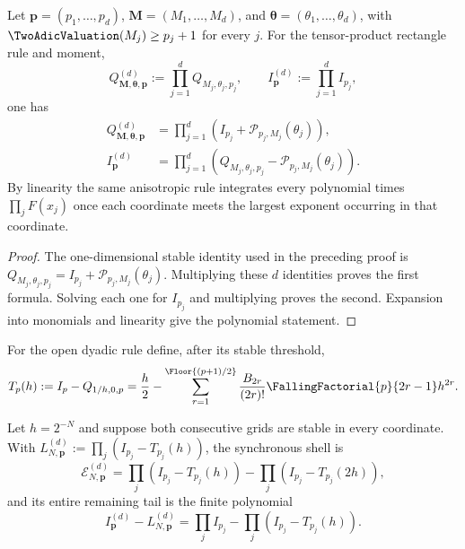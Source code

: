 \begin{theorem}
\label{thm:tensor-correction}
Let $\bm p=(p_1,\ldots,p_d)$, $\bm M=(M_1,\ldots,M_d)$, and
$\bm\theta=(\theta_1,\ldots,\theta_d)$, with
$\TwoAdicValuation(M_j)\ge p_j+1$ for every $j$.  For the tensor-product
rectangle rule and moment,
\[
 Q_{\bm M,\bm\theta,\bm p}^{(d)}
 :=\prod_{j=1}^dQ_{M_j,\theta_j,p_j},
 \qquad I_{\bm p}^{(d)}:=\prod_{j=1}^dI_{p_j},
\]
one has
\begin{align}
 Q_{\bm M,\bm\theta,\bm p}^{(d)}
 &=\prod_{j=1}^d\left(I_{p_j}+\mathcal P_{p_j,M_j}(\theta_j)\right),
 \label{eq:tensor-product-correction}\\
  I_{\bm p}^{(d)}
  &=\boxed{\prod_{j=1}^d\left(Q_{M_j,\theta_j,p_j}
  -\mathcal P_{p_j,M_j}(\theta_j)\right)}.
 \label{eq:tensor-exact-moment}
\end{align}
By linearity the same anisotropic rule integrates every polynomial times
$\prod_jF(x_j)$ once each coordinate meets the largest exponent occurring
in that coordinate.
\end{theorem}

\begin{proof}
The one-dimensional stable identity used in the preceding proof is
$Q_{M_j,\theta_j,p_j}=I_{p_j}+\mathcal P_{p_j,M_j}(\theta_j)$.
Multiplying these $d$ identities proves the first formula.  Solving each
one for $I_{p_j}$ and multiplying proves the second.  Expansion into
monomials and linearity give the polynomial statement.
\end{proof}

For the open dyadic rule define, after its stable threshold,
\[
 T_p(h):=I_p-Q_{1/h,0,p}
 ={h\over2}-\sum_{r=1}^{\Floor{(p+1)/2}}
 {B_{2r}\over(2r)!}\FallingFactorial{p}{2r-1}h^{2r}.
\]

\begin{corollary}
\label{cor:tensor-Ruffa-shell}
Let $h=2^{-N}$ and suppose both consecutive grids are stable in every
coordinate.  With
$L_{N,\bm p}^{(d)}:=\prod_j(I_{p_j}-T_{p_j}(h))$, the synchronous shell is
\begin{equation}
 \boxed{\mathcal E_{N,\bm p}^{(d)}
 =\prod_j\left(I_{p_j}-T_{p_j}(h)\right)
 -\prod_j\left(I_{p_j}-T_{p_j}(2h)\right),}
 \label{eq:tensor-Ruffa-shell}
\end{equation}
and its entire remaining tail is the finite polynomial
\begin{equation}
 \boxed{I_{\bm p}^{(d)}-L_{N,\bm p}^{(d)}
 =\prod_jI_{p_j}
 -\prod_j\left(I_{p_j}-T_{p_j}(h)\right).}
 \label{eq:tensor-tail}
\end{equation}
\end{corollary}

